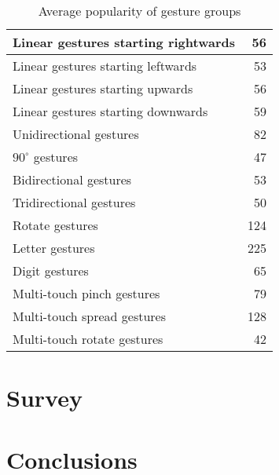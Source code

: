 \documentclass{aes130}
\begin{document}
\begin{table} \label{tab:PrelimSurveyAverageGroups}
\begin{center}
\begin{tabular}{|l|r|} \hline

Linear gestures starting rightwards &  56 \\ \hline
Linear gestures starting leftwards  &  53 \\ \hline
Linear gestures starting upwards    &  56 \\ \hline
Linear gestures starting downwards  &  59 \\ \hline \hline

Unidirectional gestures             &  82 \\ \hline
$90^\circ$ gestures                 &  47 \\ \hline
Bidirectional gestures              &  53 \\ \hline
Tridirectional gestures             &  50 \\ \hline \hline

Rotate gestures                     & 124 \\ \hline \hline

Letter gestures                     & 225 \\ \hline
Digit gestures                      &  65 \\ \hline \hline

Multi-touch pinch gestures          &  79 \\ \hline
Multi-touch spread gestures         & 128 \\ \hline
Multi-touch rotate gestures         &  42 \\ \hline

\end{tabular}
\end{center}
\caption{Average popularity of gesture groups}
\end{table}







%


\section{Survey}


\section{Conclusions}



\end{document}
